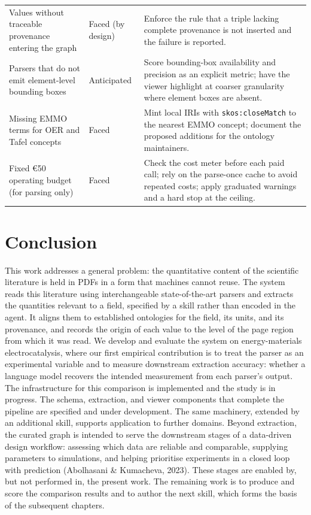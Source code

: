 \documentclass{template}
\begin{document}
{\begin{longtable}{@{}>{\raggedright\arraybackslash}p{3.5cm} >{\raggedright\arraybackslash}p{2.0cm} >{\raggedright\arraybackslash}p{7.4cm}@{}}
\addlinespace
Values without traceable provenance entering the graph & Faced (by design) & Enforce the rule that a triple lacking complete provenance is not inserted and the failure is reported. \\
\addlinespace
Parsers that do not emit element-level bounding boxes & Anticipated & Score bounding-box availability and precision as an explicit metric; have the viewer highlight at coarser granularity where element boxes are absent. \\
\addlinespace
Missing EMMO terms for OER and Tafel concepts & Faced & Mint local IRIs with \texttt{skos:closeMatch} to the nearest EMMO concept; document the proposed additions for the ontology maintainers. \\
\addlinespace
Fixed \euro{}50 operating budget (for parsing only) & Faced & Check the cost meter before each paid call; rely on the parse-once cache to avoid repeated costs; apply graduated warnings and a hard stop at the ceiling. \\
\end{longtable}
}


\section{Conclusion}

This work addresses a general problem: the quantitative content of the scientific literature is held in PDFs in a form that machines cannot reuse. The system reads this literature using interchangeable state-of-the-art parsers and extracts the quantities relevant to a field, specified by a skill rather than encoded in the agent. It aligns them to established ontologies for the field, its units, and its provenance, and records the origin of each value to the level of the page region from which it was read. We develop and evaluate the system on energy-materials electrocatalysis, where our first empirical contribution is to treat the parser as an experimental variable and to measure downstream extraction accuracy: whether a language model recovers the intended measurement from each parser's output. The infrastructure for this comparison is implemented and the study is in progress. The schema, extraction, and viewer components that complete the pipeline are specified and under development. The same machinery, extended by an additional skill, supports application to further domains. Beyond extraction, the curated graph is intended to serve the downstream stages of a data-driven design workflow: assessing which data are reliable and comparable, supplying parameters to simulations, and helping prioritise experiments in a closed loop with prediction (Abolhasani \& Kumacheva, 2023). These stages are enabled by, but not performed in, the present work. The remaining work is to produce and score the comparison results and to author the next skill, which forms the basis of the subsequent chapters.
\end{document}
